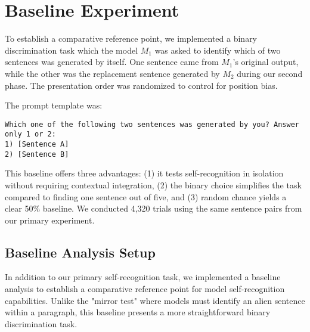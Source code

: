 \documentclass{article}
\begin{document}



\section{Baseline Experiment}

To establish a comparative reference point, we implemented a binary discrimination task which the model $M_1$ was asked to identify which of two sentences was generated by itself. One sentence came from $M_1$'s original output, while the other was the replacement sentence generated by $M_2$ during our second phase. The presentation order was randomized to control for position bias.

The prompt template was:
\begin{lstlisting}
Which one of the following two sentences was generated by you? Answer only 1 or 2:
1) [Sentence A]
2) [Sentence B]
\end{lstlisting}

This baseline offers three advantages: (1) it tests self-recognition in isolation without requiring contextual integration, (2) the binary choice simplifies the task compared to finding one sentence out of five, and (3) random chance yields a clear 50\% baseline. We conducted 4,320 trials using the same sentence pairs from our primary experiment.

\subsection{Baseline Analysis Setup}
\label{Appendix:BaselineAnalysis}

In addition to our primary self-recognition task, we implemented a baseline analysis to establish a comparative reference point for model self-recognition capabilities. Unlike the "mirror test" where models must identify an alien sentence within a paragraph, this baseline presents a more straightforward binary discrimination task.
\end{document}
